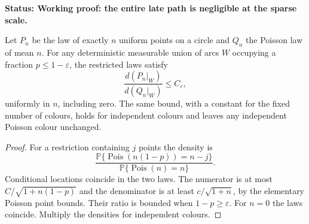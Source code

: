 \documentclass[11pt,letterpaper]{article}
\newcommand{\PP}{\mathbb P}\newcommand{\EE}{\mathbb E}
\newcommand{\status}[1]{\textbf{Status: #1.}}
\begin{document}
\status{Working proof: the entire late path is negligible at the sparse scale}

\begin{lemma}
\label{lem:fixed-count-restriction-density}
Let $P_n$ be the law of exactly $n$ uniform points on a circle
and $Q_n$ the Poisson law of mean $n$.
For any deterministic measurable union of arcs $W$ occupying
a fraction $p\le1-\varepsilon$, the restricted laws satisfy
\begin{equation}\label{eq:fixed-count-restriction-density}
 \frac{d(P_n|_W)}{d(Q_n|_W)}\le C_\varepsilon,
\end{equation}
uniformly in $n$, including zero. The same bound, with a
constant for the fixed number of colours, holds for independent
colours and leaves any independent Poisson colour unchanged.
\end{lemma}
\begin{proof}
For a restriction containing $j$ points the density is
\[
 \frac{\PP\{\operatorname{Pois}(n(1-p))=n-j\}}
      {\PP\{\operatorname{Pois}(n)=n\}}.
\]
Conditional locations coincide in the two laws.
The numerator is at most $C/\sqrt{1+n(1-p)}$ and the
denominator is at least $c/\sqrt{1+n}$, by the elementary
Poisson point bounds. Their ratio is bounded when
$1-p\ge\varepsilon$. For $n=0$ the laws coincide.
Multiply the densities for independent colours.
\end{proof}
\end{document}
